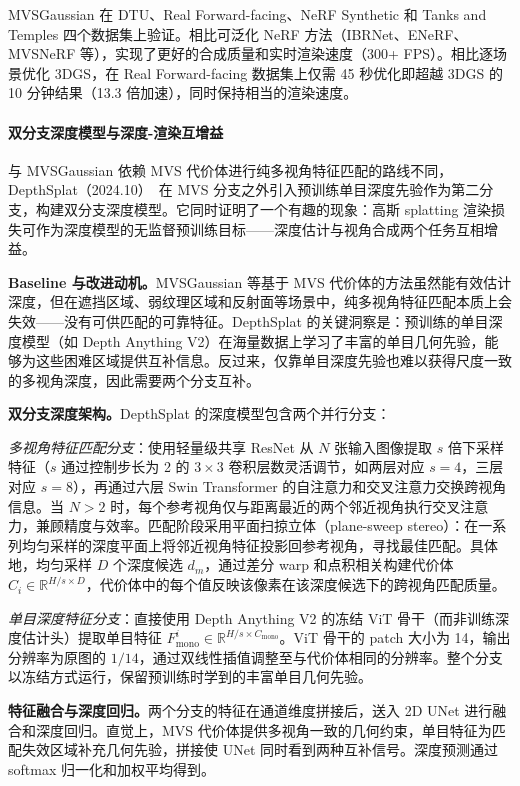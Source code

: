MVSGaussian 在 DTU、Real Forward-facing、NeRF Synthetic 和 Tanks and Temples 四个数据集上验证。相比可泛化 NeRF 方法（IBRNet、ENeRF、MVSNeRF 等），实现了更好的合成质量和实时渲染速度（300+ FPS）。相比逐场景优化 3DGS，在 Real Forward-facing 数据集上仅需 45 秒优化即超越 3DGS 的 10 分钟结果（13.3 倍加速），同时保持相当的渲染速度。

\paragraph{双分支深度模型与深度-渲染互增益}

与 MVSGaussian 依赖 MVS 代价体进行纯多视角特征匹配的路线不同，DepthSplat（2024.10）~\cite{2410_13862}在 MVS 分支之外引入预训练单目深度先验作为第二分支，构建双分支深度模型。它同时证明了一个有趣的现象：高斯 splatting 渲染损失可作为深度模型的无监督预训练目标——深度估计与视角合成两个任务互相增益。

\textbf{Baseline 与改进动机。}MVSGaussian 等基于 MVS 代价体的方法虽然能有效估计深度，但在遮挡区域、弱纹理区域和反射面等场景中，纯多视角特征匹配本质上会失效——没有可供匹配的可靠特征。DepthSplat 的关键洞察是：预训练的单目深度模型（如 Depth Anything V2）在海量数据上学习了丰富的单目几何先验，能够为这些困难区域提供互补信息。反过来，仅靠单目深度先验也难以获得尺度一致的多视角深度，因此需要两个分支互补。

\textbf{双分支深度架构。}DepthSplat 的深度模型包含两个并行分支：

\textit{多视角特征匹配分支}：使用轻量级共享 ResNet 从 $N$ 张输入图像提取 $s$ 倍下采样特征（$s$ 通过控制步长为 2 的 $3\times3$ 卷积层数灵活调节，如两层对应 $s=4$，三层对应 $s=8$），再通过六层 Swin Transformer 的自注意力和交叉注意力交换跨视角信息。当 $N>2$ 时，每个参考视角仅与距离最近的两个邻近视角执行交叉注意力，兼顾精度与效率。匹配阶段采用平面扫掠立体（plane-sweep stereo）：在一系列均匀采样的深度平面上将邻近视角特征投影回参考视角，寻找最佳匹配。具体地，均匀采样 $D$ 个深度候选 $d_m$，通过差分 warp 和点积相关构建代价体 $C_i \in \mathbb{R}^{H/s \times D}$，代价体中的每个值反映该像素在该深度候选下的跨视角匹配质量。

\textit{单目深度特征分支}：直接使用 Depth Anything V2 的冻结 ViT 骨干（而非训练深度估计头）提取单目特征 $F^i_{\text{mono}} \in \mathbb{R}^{H/s \times C_{\text{mono}}}$。ViT 骨干的 patch 大小为 14，输出分辨率为原图的 $1/14$，通过双线性插值调整至与代价体相同的分辨率。整个分支以冻结方式运行，保留预训练时学到的丰富单目几何先验。

\textbf{特征融合与深度回归。}两个分支的特征在通道维度拼接后，送入 2D UNet 进行融合和深度回归。直觉上，MVS 代价体提供多视角一致的几何约束，单目特征为匹配失效区域补充几何先验，拼接使 UNet 同时看到两种互补信号。深度预测通过 softmax 归一化和加权平均得到。

